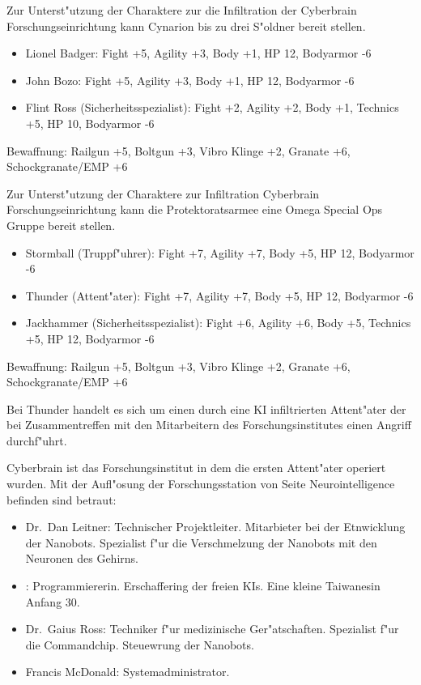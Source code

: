 Zur Unterst"utzung der Charaktere zur die Infiltration der Cyberbrain Forschungseinrichtung kann Cynarion bis zu 
drei S"oldner bereit stellen.

\begin{itemize}
    \item Lionel Badger: Fight +5, Agility +3, Body +1, HP 12, Bodyarmor -6
    \item John Bozo: Fight +5, Agility +3, Body +1, HP 12, Bodyarmor -6
    \item Flint Ross (Sicherheitsspezialist): Fight +2, Agility +2, Body +1, Technics +5, HP 10, Bodyarmor -6
\end{itemize}

Bewaffnung: Railgun +5, Boltgun +3, Vibro Klinge +2, Granate +6, Schockgranate/EMP +6 


Zur Unterst"utzung der Charaktere zur Infiltration  Cyberbrain Forschungseinrichtung kann die Protektoratsarmee eine 
Omega Special Ops Gruppe bereit stellen.

\begin{itemize}
    \item Stormball (Truppf"uhrer): Fight +7, Agility +7, Body +5, HP 12, Bodyarmor -6
    \item Thunder (Attent"ater): Fight +7, Agility +7, Body +5, HP 12, Bodyarmor -6
    \item Jackhammer (Sicherheitsspezialist): Fight +6, Agility +6, Body +5, Technics +5, HP 12, Bodyarmor -6
\end{itemize}

Bewaffnung: Railgun +5, Boltgun +3, Vibro Klinge +2, Granate +6, Schockgranate/EMP +6 

Bei Thunder handelt es sich um einen durch eine KI infiltrierten Attent"ater der bei Zusammentreffen mit den 
Mitarbeitern des Forschungsinstitutes einen Angriff durchf"uhrt.

\renewcommand{\ml}{\pinyin{Mailin2}}


Cyberbrain ist das Forschungsinstitut in dem die ersten Attent"ater operiert wurden. Mit der Aufl"osung der Forschungsstation von Seite Neurointelligence befinden sind betraut:

\begin{itemize}
    \item Dr.~Dan Leitner: Technischer Projektleiter. Mitarbieter bei der Etnwicklung der Nanobots. Spezialist f"ur die Verschmelzung 
        der  Nanobots mit den Neuronen des Gehirns.
    \item \ml{}: Programmiererin. Erschaffering der freien KIs. Eine kleine Taiwanesin Anfang 30. 
    \item Dr.~Gaius Ross: Techniker f"ur medizinische Ger"atschaften. Spezialist f"ur die Commandchip. Steuewrung der Nanobots.
    \item Francis McDonald: Systemadministrator.
\end{itemize}

